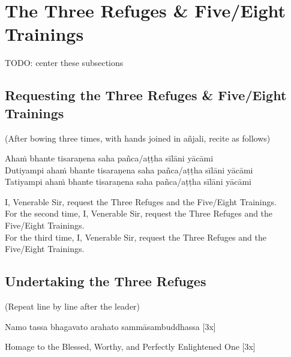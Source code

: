 \section*{The Three Refuges \& Five/Eight Trainings}
TODO: center these subsections
\subsection{Requesting the Three Refuges \& Five/Eight Trainings}


\begin{center}
(After bowing three times, with hands joined in añjali, recite as follows)\\
\end{center}

Ahaṁ bhante tisaraṇena saha pañca/aṭṭha sīlāni yācāmi\\
Dutiyampi ahaṁ bhante tisaraṇena saha pañca/aṭṭha sīlāni yācāmi\\
Tatiyampi ahaṁ bhante tisaraṇena saha pañca/aṭṭha sīlāni yācāmi\\

\begin{english}
I, Venerable Sir, request the Three Refuges and the Five/Eight Trainings.\\
For the second time, I, Venerable Sir, request the Three Refuges and the Five/Eight Trainings.\\
For the third time, I, Venerable Sir, request the Three Refuges and the Five/Eight Trainings.
\end{english}

\subsection*{Undertaking the Three Refuges}

\begin{center}
(Repeat line by line after the leader)\\
\end{center}

Namo tassa bhagavato arahato sammāsambuddhassa \hfill{[3x]}\\

\begin{english}
Homage to the Blessed, Worthy, and Perfectly Enlightened One \hfill{[3x]}\\
\end{english}

